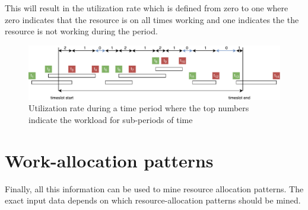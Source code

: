This will result in the utilization rate which is defined from zero to one where zero indicates that the resource is on all times working  and one indicates the the resource is not working during the period. 

\begin{figure}[h]
	\centering
    \includegraphics[width=\textwidth]{figures/utilization_rate}
    \caption{Utilization rate during a time period where the top numbers indicate the workload for sub-periods of time}
    \label{fig:utilization_rate}
\end{figure}


\section{Work-allocation patterns}
Finally, all this information can be used to mine resource allocation patterns. The exact input data depends on which resource-allocation patterns should be mined. 





